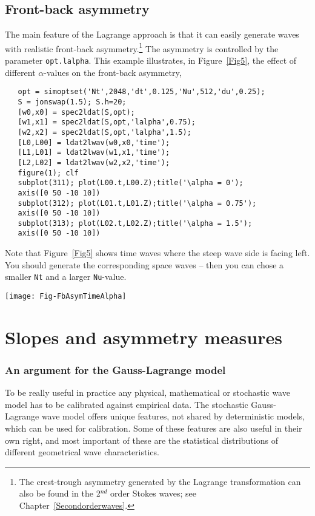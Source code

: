 \subsection{Front-back asymmetry}\label{ss:frontbackasymmetry}
The main feature of the Lagrange approach is that it can easily generate waves with realistic front-back asymmetry.\footnote{The crest-trough asymmetry generated by the Lagrange transformation can also be found in the 2$^{nd}$ order Stokes waves; see 
Chapter~\ref{Secondorderwaves}.}
The asymmetry is controlled by the parameter {\tt opt.lalpha}.
This example illustrates, in Figure~\ref{Fig5},  the effect of different $\alpha$-values on the front-back asymmetry,

{\small\begin{verbatim}
   opt = simoptset('Nt',2048,'dt',0.125,'Nu',512,'du',0.25);
   S = jonswap(1.5); S.h=20;
   [w0,x0] = spec2ldat(S,opt);
   [w1,x1] = spec2ldat(S,opt,'lalpha',0.75);
   [w2,x2] = spec2ldat(S,opt,'lalpha',1.5);
   [L0,L00] = ldat2lwav(w0,x0,'time');
   [L1,L01] = ldat2lwav(w1,x1,'time');
   [L2,L02] = ldat2lwav(w2,x2,'time');
   figure(1); clf
   subplot(311); plot(L00.t,L00.Z);title('\alpha = 0');
   axis([0 50 -10 10])
   subplot(312); plot(L01.t,L01.Z);title('\alpha = 0.75');
   axis([0 50 -10 10])
   subplot(313); plot(L02.t,L02.Z);title('\alpha = 1.5');
   axis([0 50 -10 10])
 \end{verbatim}
}
\noindent Note that Figure~\ref{Fig5} shows time waves where the steep wave side is facing left. You should generate the corresponding space waves -- then you can chose
a smaller {\tt Nt} and a larger {\tt Nu}-value.
 \begin{SCfigure}[1][t]
\texttt{[image: Fig-FbAsymTimeAlpha]}
\caption{Front-back asymmetric Lagrange time waves with different $\alpha$-values. Water depth:  {\tt S.h = 20[m]}. }
\label{Fig5}
\end{SCfigure}
\section{Slopes and asymmetry measures}
\subsubsection*{An argument for the Gauss-Lagrange model}

To be really useful in practice any physical,  mathematical or stochastic wave model has to be calibrated against empirical data. The stochastic Gauss-Lagrange wave model offers unique features, not shared by deterministic models, which can be used for calibration. Some of these features are also useful in their own right, and most important of these are the statistical distributions of different geometrical wave characteristics.

